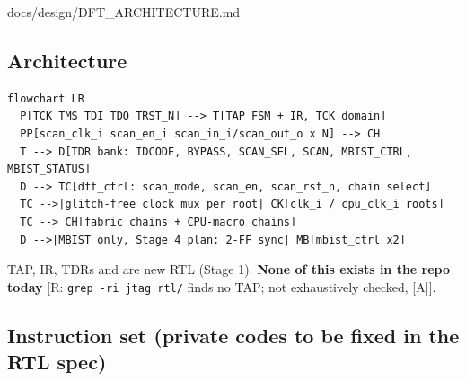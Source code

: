 \begin{relocated}{docs/design/DFT_ARCHITECTURE.md}
\subsection{Architecture}\label{tm:ch:dft-architecture:91-architecture}

\begin{lstlisting}[language={},caption={Diagram source (Mermaid)}]
flowchart LR
  P[TCK TMS TDI TDO TRST_N] --> T[TAP FSM + IR, TCK domain]
  PP[scan_clk_i scan_en_i scan_in_i/scan_out_o x N] --> CH
  T --> D[TDR bank: IDCODE, BYPASS, SCAN_SEL, SCAN, MBIST_CTRL, MBIST_STATUS]
  D --> TC[dft_ctrl: scan_mode, scan_en, scan_rst_n, chain select]
  TC -->|glitch-free clock mux per root| CK[clk_i / cpu_clk_i roots]
  TC --> CH[fabric chains + CPU-macro chains]
  D -->|MBIST only, Stage 4 plan: 2-FF sync| MB[mbist_ctrl x2]
\end{lstlisting}

TAP, IR, TDRs and  are new RTL (Stage 1). \textbf{None of
this exists in the repo today} {[}R:
\texttt{grep\ -\allowbreak{}ri\ jtag\ rtl/\allowbreak{}} finds no TAP;
not exhaustively checked, {[}A{]}{]}.

\subsection{Instruction set (private codes to be fixed in the RTL
spec)}\label{tm:ch:dft-architecture:92-instruction-set-private-codes-to-be-fixed-in-the-rtl-spec}

{\footnotesize\setlength{\tabcolsep}{3pt}

}
\end{relocated}
